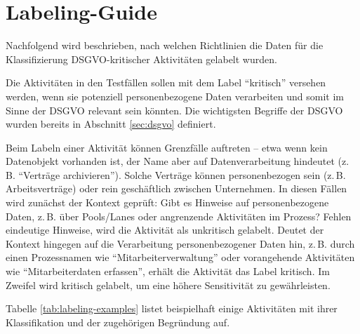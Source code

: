 \section{Labeling-Guide}\label{sec:labeling-guide}

Nachfolgend wird beschrieben, nach welchen Richtlinien die Daten für die Klassifizierung \ac{DSGVO}-kritischer Aktivitäten gelabelt wurden.

Die Aktivitäten in den Testfällen sollen mit dem Label \enquote{kritisch} versehen werden, wenn sie potenziell personenbezogene Daten verarbeiten und somit im Sinne der \ac{DSGVO} relevant sein könnten. Die wichtigsten Begriffe der \ac{DSGVO} wurden bereits in Abschnitt \ref{sec:dsgvo} definiert.

Beim Labeln einer Aktivität können Grenzfälle auftreten – etwa wenn kein Datenobjekt vorhanden ist, der Name aber auf Datenverarbeitung hindeutet (z.\,B. \enquote{Verträge archivieren}). Solche Verträge können personenbezogen sein (z.\,B. Arbeitsverträge) oder rein geschäftlich zwischen Unternehmen. In diesen Fällen wird zunächst der Kontext geprüft: Gibt es Hinweise auf personenbezogene Daten, z.\,B. über Pools/Lanes oder angrenzende Aktivitäten im Prozess? Fehlen eindeutige Hinweise, wird die Aktivität als unkritisch gelabelt. Deutet der Kontext hingegen auf die Verarbeitung personenbezogener Daten hin, z.\,B. durch einen Prozessnamen wie \enquote{Mitarbeiterverwaltung} oder vorangehende Aktivitäten wie \enquote{Mitarbeiterdaten erfassen}, erhält die Aktivität das Label kritisch. Im Zweifel wird kritisch gelabelt, um eine höhere Sensitivität zu gewährleisten.

Tabelle \ref{tab:labeling-examples} listet beispielhaft einige Aktivitäten mit ihrer Klassifikation und der zugehörigen Begründung auf.

